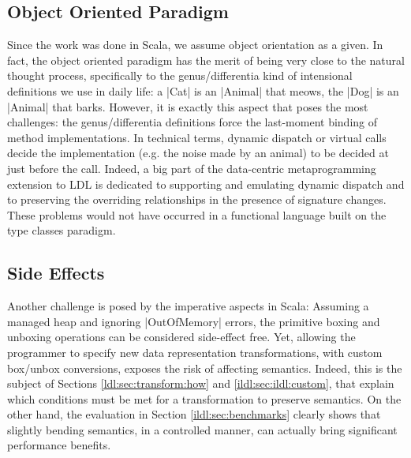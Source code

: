 \subsection{Object Oriented Paradigm}



Since the work was done in Scala, we assume object orientation as a given. In fact, the object oriented paradigm has the merit of being very close to the natural thought process, specifically to the genus/differentia kind of intensional definitions we use in daily life: a |Cat| is an |Animal| that meows, the |Dog| is an |Animal| that barks. However, it is exactly this aspect that poses the most challenges: the genus/differentia definitions force the last-moment binding of method implementations. In technical terms, dynamic dispatch or virtual calls decide the implementation (e.g. the noise made by an animal) to be decided at just before the call. Indeed, a big part of the data-centric metaprogramming extension to LDL is dedicated to supporting and emulating dynamic dispatch and to preserving the overriding relationships in the presence of signature changes. These problems would not have occurred in a functional language built on the type classes paradigm.

\subsection{Side Effects}

Another challenge is posed by the imperative aspects in Scala: Assuming a managed heap and ignoring |OutOfMemory| errors, the primitive boxing and unboxing operations can be considered side-effect free. Yet, allowing the programmer to specify new data representation transformations, with custom box/unbox conversions, exposes the risk of affecting semantics. Indeed, this is the subject of Sections \ref{ldl:sec:transform:how} and \ref{ildl:sec:ildl:custom}, that explain which conditions must be met for a transformation to preserve semantics. On the other hand, the evaluation in Section \ref{ildl:sec:benchmarks} clearly shows that slightly bending semantics, in a controlled manner, can actually bring significant performance benefits.

